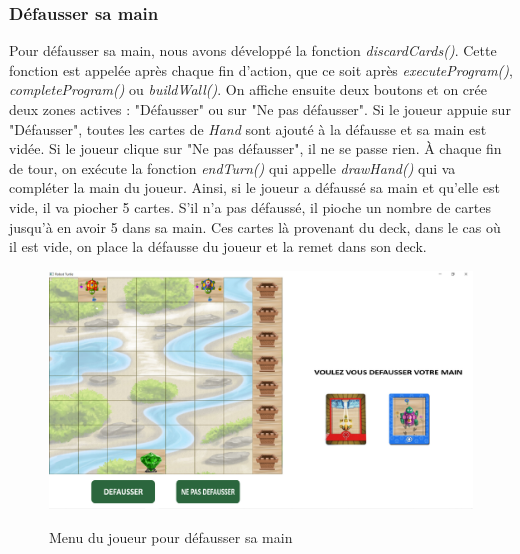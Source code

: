 \documentclass{article}
\begin{document}
\newpage

		\subsubsection{Défausser sa main}  
\indent Pour défausser sa main, nous avons développé la fonction \textit{discardCards()}. Cette fonction est appelée après chaque fin d'action, que ce soit après  \textit{executeProgram()},  \textit{completeProgram()} ou  \textit{buildWall()}. On affiche ensuite deux boutons et on crée deux zones actives :   "Défausser" ou sur "Ne pas défausser". Si le joueur appuie sur "Défausser",  toutes les cartes de \textit{Hand} sont ajouté à la défausse et sa main est vidée. Si le joueur clique sur "Ne pas défausser", il ne se passe rien. 
À chaque fin de tour, on exécute la fonction \textit{endTurn()} qui appelle \textit{drawHand()} qui va compléter la main du joueur. Ainsi, si le joueur a défaussé sa main et qu'elle est vide, il va piocher 5 cartes. S'il n'a pas défaussé, il pioche un nombre de cartes jusqu'à en avoir 5 dans sa main. Ces cartes là provenant du deck, dans le cas où il est vide, on place la défausse du joueur et la remet dans son deck.
\medbreak
\begin{figure}[h]
	\begin{center}
		\includegraphics[scale=0.2]{../img/discard_hand_screenshot} \\
	\end{center}
	\caption{Menu du joueur pour défausser sa main}
\end{figure}
\newpage
\end{document}

